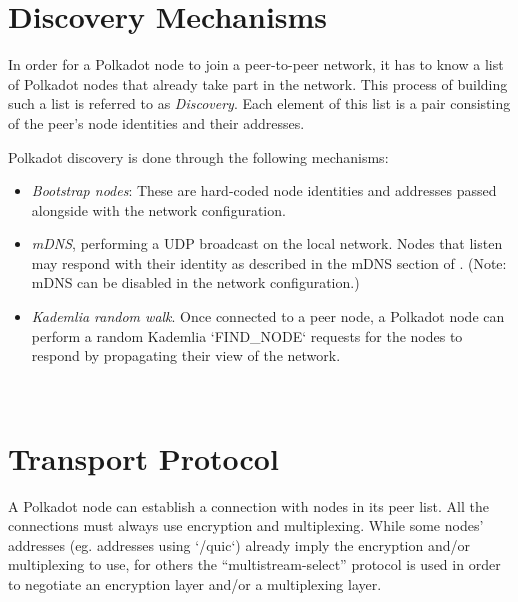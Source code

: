 \documentclass{book}
\newcommand{\tmem}[1]{{\em #1\/}}
\newcommand{\tmtextit}[1]{{\itshape{#1}}}
\providecommand{\tmem}[1]{\tmtextit{#1}}
\providecommand{\tmtextit}[1]{\tmtextit{#1}}
\begin{document}
{}

\section{Discovery Mechanisms}

In order for a Polkadot node to join a peer-to-peer network, it has to know a
list of Polkadot nodes that already take part in the network. This process of
building such a list is referred to as {\tmem{Discovery}}. Each element of
this list is a pair consisting of the peer's node identities and their
addresses.

{}

Polkadot discovery is done through the following mechanisms:
\begin{itemize}
  \item {\tmem{Bootstrap nodes}}: These are hard-coded node identities and
  addresses passed alongside with the network configuration.
  
  \item {\tmem{mDNS}}, performing a UDP broadcast on the local network. Nodes
  that listen may respond with their identity as described in the mDNS section
  of {\cite{protocol_labs_libp2p_2019}}. (Note: mDNS can be disabled in the
  network configuration.)
  
  \item {\tmem{Kademlia random walk}}. Once connected to a peer node, a
  Polkadot node can perform a random Kademlia `FIND\_NODE` requests for the
  nodes {} to respond by propagating their view of the
  network.
  
  \ 
\end{itemize}

\section{Transport Protocol}

A Polkadot node can establish a connection with nodes in its peer list. All
the connections must always use encryption and multiplexing. While some nodes'
addresses (eg. addresses using `/quic`) already imply the encryption and/or
multiplexing to use, for others the ``multistream-select'' protocol is used in
order to negotiate an encryption layer and/or a multiplexing layer.
\end{document}
